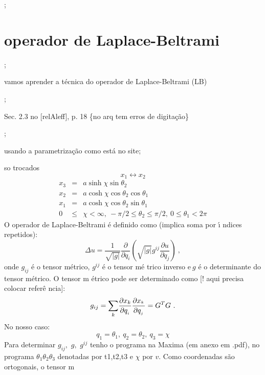 \documentclass[a4paper,12pt]{article}
\begin{document}
;

\section{operador de Laplace-Beltrami}

;

vamos aprender a t\'{e}cnica do operador de Laplace-Beltrami (LB)

;

Sec. 2.3 no [relAleff], p. 18 \{no arq tem erros de digita\c{c}\~{a}o\}

;

usando a parametriza\c{c}\~{a}o como est\'{a} no site;

so trocados%
\begin{equation*}
x_{1}\leftrightarrow x_{2}
\end{equation*}%
\begin{eqnarray*}
x_{3} &=&a\sinh \chi \sin \theta _{2} \\
x_{2} &=&a\cosh \chi \cos \theta _{2}\cos \theta _{1} \\
x_{1} &=&a\cosh \chi \cos \theta _{2}\sin \theta _{1} \\
0 &\leq &\chi <\infty ,\ -\pi /2\leq \theta _{2}\leq \pi /2,\ 0\leq \theta
_{1}<2\pi 
\end{eqnarray*}%
O operador de Laplace-Beltrami \'{e} definido como (implica soma por \'{\i}%
ndices repetidos):%
\begin{equation}
\Delta u=\frac{1}{\sqrt{\left\vert g\right\vert }}\frac{\partial }{\partial
q_{i}}\left( \sqrt{\left\vert g\right\vert }g^{ij}\frac{\partial u}{\partial
q_{j}}\right) \ ,  \label{eq98}
\end{equation}%
onde $g_{ij}$ \'{e} o tensor m\'{e}trico, $g^{ij}$ \'{e} o tensor m\'{e}%
trico inverso e$\ g$ \'{e} o determinante do tensor m\'{e}trico. O tensor m%
\'{e}trico pode ser determinado como [! aqui precisa colocar refer\^{e}%
ncia]: 
\begin{equation}
g_{ij}=\underset{k}{\sum }\frac{\partial x_{k}}{\partial q_{_{^{i}}}}\frac{%
\partial x_{^{_{k}}}}{\partial q_{_{^{j}}}}=G^{T}G\ .  \label{eq99}
\end{equation}%
No nosso caso:%
\begin{equation*}
q_{1}=\theta _{1},\ q_{2}=\theta _{2},\ q_{3}=\chi 
\end{equation*}%
Para determinar $g_{ij},$ $g,$ $g^{ij}$ tenho o programa na Maxima (em anexo
em .pdf), no programa $\theta _{1}\theta _{2}\theta _{3}$ denotadas por
t1,t2,t3 e $\chi $ por $v.$ Como coordenadas s\~{a}o ortogonais, o tensor m%
\end{document}
